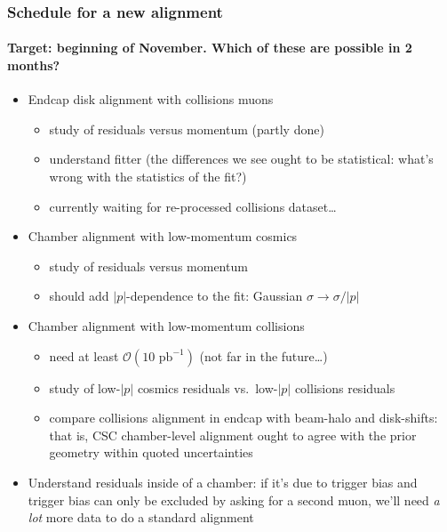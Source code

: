 \documentclass[compress]{beamer}
\begin{document}
\begin{frame}
\frametitle{Schedule for a new alignment}
\framesubtitle{Target: beginning of November.  Which of these are possible in 2 months?}
\begin{itemize}
\item Endcap disk alignment with collisions muons
\begin{itemize}
\item study of residuals versus momentum (partly done)
\item understand fitter (the differences we see ought to be statistical: what's wrong with the statistics of the fit?)
\item currently waiting for re-processed collisions dataset\ldots
\end{itemize}

\item Chamber alignment with low-momentum cosmics
\begin{itemize}
\item study of residuals versus momentum
\item should add $|p|$-dependence to the fit: Gaussian $\sigma \to \sigma/|p|$
\end{itemize}

\item Chamber alignment with low-momentum collisions
\begin{itemize}
\item need at least $\mathcal{O}(10\mbox{ pb}^{-1})$ (not far in the future\ldots)
\item study of low-$|p|$ cosmics residuals vs.\ low-$|p|$ collisions residuals
\item compare collisions alignment in endcap with beam-halo and disk-shifts: that is, CSC chamber-level alignment ought to agree with the prior geometry within quoted uncertainties
\end{itemize}

\item Understand residuals inside of a chamber: if it's due to trigger
  bias and trigger bias can only be excluded by asking for a second
  muon, we'll need {\it a lot} more data to do a standard alignment
\end{itemize}
\label{numpages}
\end{frame}
\end{document}
